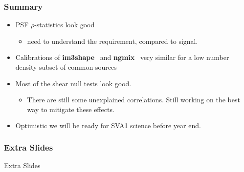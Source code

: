 \documentclass{beamer}
\newcommand{\ngmix}{ {\bf ngmix} }
\newcommand{\imshape}{ {\bf im3shape} }
\begin{document}
\frame
{
    \frametitle{Summary}

    \begin{itemize}

        \item PSF $\rho$-statistics look good
            \begin{itemize}
                \item need to understand the requirement, compared to signal.
            \end{itemize}

        \item Calibrations of \imshape\ and \ngmix\ very similar for a low number
            density subset of common sources

        \item Most of the shear null tests look good.

            \begin{itemize}

                \item There are still some unexplained correlations.  Still working
                    on the best way to mitigate these effects.

            \end{itemize}
            
        \item Optimistic we will be ready for SVA1 science before year end.

    \end{itemize}
}


\frame
{
    \frametitle{Extra Slides}
    {\Huge Extra Slides}
}
\end{document}
